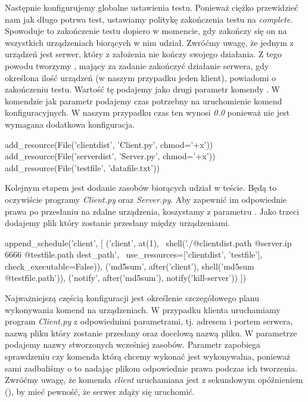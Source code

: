 \documentclass[00-praca-magisterska.tex]{subfiles}
\begin{document}
Następnie konfigurujemy globalne ustawienia testu. Ponieważ ciężko przewidzieć
nam jak długo potrwa test, ustawiamy politykę zakończenia testu na
\emph{complete}. Spowoduje to zakończenie testu dopiero w momencie, gdy zakończy
się on na wszystkich urządzeniach biorących w nim udział. Zwróćmy uwagę, że
jednym z urządzeń jest serwer, który z założenia nie kończy swojego działania. Z
tego powodu tworzymy , mający za zadanie zakończyć działanie
serwera, gdy określona ilość urządzeń (w naszym przypadku jeden klient),
powiadomi o zakończeniu testu. Wartość tę podajemy jako drugi parametr komendy
. W komendzie  jak parametr
 podajemy czas potrzebny na uruchomienie komend
konfiguracyjnych. W naszym przypadku czas ten wynosi \emph{0.0} ponieważ nie
jest wymagana dodatkowa konfiguracja.

\begin{pythoncode}
  add_resource(File('clientdist', 'Client.py', chmod='+x'))
  add_resource(File('serverdist', 'Server.py', chmod='+x'))
  add_resource(File('testfile', 'datafile.txt'))
\end{pythoncode}

Kolejnym etapem jest dodanie zasobów biorących udział w teście. Będą to
oczywiście programy \emph{Client.py} oraz \emph{Server.py}. Aby zapewnić im
odpowiednie prawa po przesłaniu na zdalne urządzenia, koszystamy z parametru
. Jako trzeci dodajemy plik który zostanie przesłany między
urządzeniami.

\begin{pythoncode}
  append_schedule('client', [
      ('client', at(1), \
          shell('./@{clientdist.path} @{server.ip} 6666 @{testfile.path} dest_path', \
	  use_resources=['clientdist', 'testfile'], check_executable=False)),
      ('md5sum', after('client'), shell('md5sum @{testfile.path}')),
      ('notify', after('md5sum'), notify('kill-server'))
  ])
\end{pythoncode}

Najważniejszą częścią konfiguracji jest określenie szczegółowego planu
wykonywania komend na urządzeniach. W przypadku klienta uruchamiamy program
\emph{Client.py} z odpowiednimi parametrami, tj. adresem i portem serwera, nazwą
pliku który zostanie przesłany oraz docelową nazwą pliku. W parametrze
\code{use\_resources} podajemy nazwy stworzonych wcześniej zasobów. Parametr
\code{check\_executable=False} zapobiega sprawdzeniu czy komenda którą chcemy wykonać
jest wykonywalna, ponieważ sami zadbaliśmy o to nadając plikom odpowiednie prawa
podczas ich tworzenia. Zwróćmy uwagę, że komenda \emph{client} uruchamiana jest
z sekundowym opóźnieniem (\code{at(1)}), by mieć pewność, że serwer zdąży się uruchomić.
\end{document}
